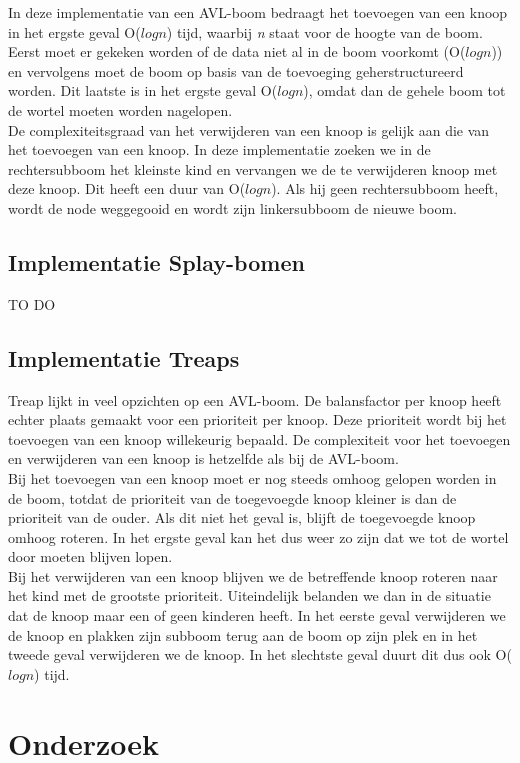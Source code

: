 \documentclass[a4paper,10pt]{article}
\begin{document}
In deze implementatie van een AVL-boom bedraagt het toevoegen van een knoop in het ergste geval O($logn$) tijd, waarbij \emph{n} staat voor de hoogte van de boom. Eerst moet er gekeken worden of de data niet al in de boom voorkomt (O($logn$)) en vervolgens moet de boom op basis van de toevoeging geherstructureerd worden. Dit laatste is in het ergste geval O($logn$), omdat dan de gehele boom tot de wortel moeten worden nagelopen. \\

De complexiteitsgraad van het verwijderen van een knoop is gelijk aan die van het toevoegen van een knoop. In deze implementatie zoeken we in de rechtersubboom het kleinste kind en vervangen we de te verwijderen knoop met deze knoop. Dit heeft een duur van O($logn$). Als hij geen rechtersubboom heeft, wordt de node weggegooid en wordt zijn linkersubboom de nieuwe boom.
\subsection{Implementatie Splay-bomen}
TO DO
\subsection{Implementatie Treaps}
Treap lijkt in veel opzichten op een AVL-boom. De balansfactor per knoop heeft echter plaats gemaakt voor een prioriteit per knoop. Deze prioriteit wordt bij het toevoegen van een knoop willekeurig bepaald. De complexiteit voor het toevoegen en verwijderen van een knoop is hetzelfde als bij de AVL-boom. \\

Bij het toevoegen van een knoop moet er nog steeds omhoog gelopen worden in de boom, totdat de prioriteit van de toegevoegde knoop kleiner is dan de prioriteit van de ouder. Als dit niet het geval is, blijft de toegevoegde knoop omhoog roteren. In het ergste geval kan het dus weer zo zijn dat we tot de wortel door moeten blijven lopen. \\

Bij het verwijderen van een knoop blijven we de betreffende knoop roteren naar het kind met de grootste prioriteit. Uiteindelijk belanden we dan in de situatie dat de knoop maar een of geen kinderen heeft.
In het eerste geval verwijderen we de knoop en plakken zijn subboom terug aan de boom op zijn plek en in het tweede geval verwijderen we de knoop. In het slechtste geval duurt dit dus ook O($logn$) tijd.
\section{Onderzoek}
\end{document}
